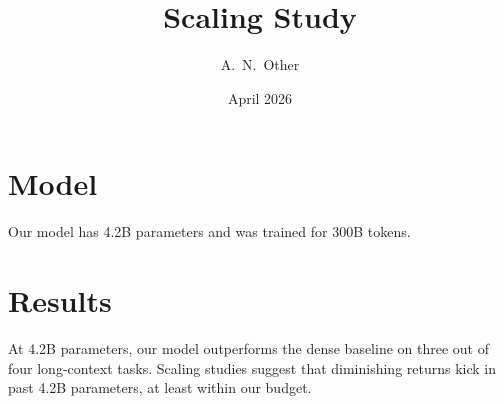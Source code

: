 \documentclass[11pt]{article}
\title{Scaling Study}
\author{A.\ N.\ Other}
\date{April 2026}
\begin{document}
\maketitle

\section{Model}

Our model has 4.2B parameters and was trained for 300B tokens.

\section{Results}

At 4.2B parameters, our model outperforms the dense baseline on three out of four long-context tasks.
Scaling studies suggest that diminishing returns kick in past 4.2B parameters, at least within our budget.
\end{document}

